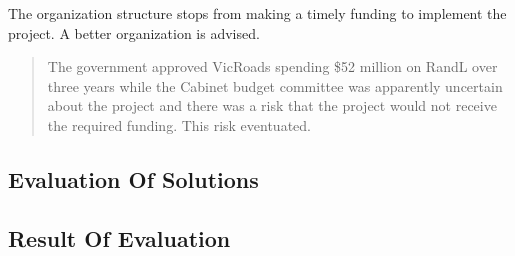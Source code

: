 The organization structure stops from making a timely funding to implement the project. A better organization is advised.
\begin{quotation}
The government approved VicRoads spending \$52 million on RandL over three years while the Cabinet budget committee was apparently uncertain about the project and there was a risk that the project would not receive the required funding. This risk eventuated.
\end{quotation}
\subsection{Evaluation Of Solutions}

\subsection{Result Of Evaluation}